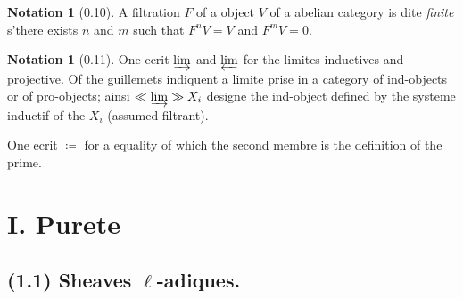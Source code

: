 \documentclass[12pt,a4paper]{article}
\theoremstyle{plain}
\theoremstyle{definition}
\newtheorem{notation}[theorem]{Notation}
\theoremstyle{definition}
\theoremstyle{remark}
\newcommand{\limind}{\varinjlim}
\newcommand{\limproj}{\varprojlim}
\begin{document}
\begin{notation}[0.10]
A filtration $F$ of a object $V$ of a abelian category is dite \emph{finite} s'there exists $n$ and $m$ such that $F^n V = V$ and $F^m V = 0$.
\end{notation}

\begin{notation}[0.11]
One ecrit $\limind$ and $\limproj$ for the limites inductives and projective. Of the guillemets indiquent a limite prise in a category of ind-objects or of pro-objects; ainsi $\ll \limind \gg X_i$ designe the ind-object defined by the systeme inductif of the $X_i$ (assumed filtrant).

One ecrit $\coloneqq$ for a equality of which the second membre is the definition of the prime.
\end{notation}

\newpage

\section*{I. Purete}

\subsection*{(1.1) Sheaves $\ell$-adiques.}
\end{document}
